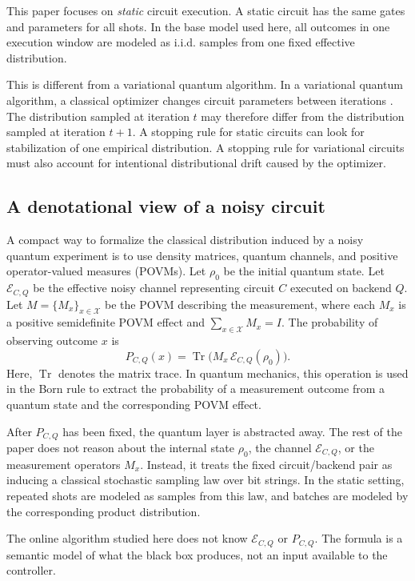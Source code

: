 This paper focuses on \emph{static} circuit execution. A static circuit has the same gates and parameters for all shots. In the base model used here, all outcomes in one execution window are modeled as i.i.d. samples from one fixed effective distribution.
 
This is different from a variational quantum algorithm. In a variational quantum algorithm, a classical optimizer changes circuit parameters between iterations \cite{cerezo2021variational,tilly2022vqe}. The distribution sampled at iteration $t$ may therefore differ from the distribution sampled at iteration $t+1$. A stopping rule for static circuits can look for stabilization of one empirical distribution. A stopping rule for variational circuits must also account for intentional distributional drift caused by the optimizer.
 
\subsection{A denotational view of a noisy circuit}
 
A compact way to formalize the classical distribution induced by a noisy quantum experiment is to use density matrices, quantum channels, and positive operator-valued measures (POVMs). Let $\rho_0$ be the initial quantum state. Let $\mathcal E_{C,Q}$ be the effective noisy channel representing circuit $C$ executed on backend $Q$. Let $M=\{M_x\}_{x\in\mathcal X}$ be the POVM describing the measurement, where each $M_x$ is a positive semidefinite POVM effect and $\sum_{x\in\mathcal X} M_x = I$. The probability of observing outcome $x$ is
\[
 P_{C,Q}(x)=\operatorname{Tr}\!\bigl(M_x\,\mathcal E_{C,Q}(\rho_0)\bigr).
\]
Here, $\operatorname{Tr}$ denotes the matrix trace. In quantum mechanics,
this operation is used in the Born rule to extract the probability of a
measurement outcome from a quantum state and the corresponding POVM effect.
 
After $P_{C,Q}$ has been fixed, the quantum layer is abstracted away. The rest of the paper does not reason about the internal state $\rho_0$, the channel $\mathcal E_{C,Q}$, or the measurement operators $M_x$. Instead, it treats the fixed circuit/backend pair as inducing a classical stochastic sampling law over bit strings. In the static setting, repeated shots are modeled as samples from this law, and batches are modeled by the corresponding product distribution.
 
The online algorithm studied here does not know $\mathcal E_{C,Q}$ or $P_{C,Q}$. The formula is a semantic model of what the black box produces, not an input available to the controller.
 

